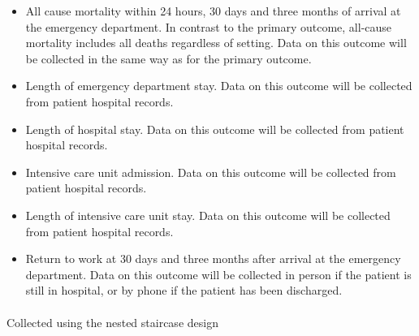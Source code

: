 \documentclass[
]{scrartcl}
\makeatletter
\let\oldparagraph\paragraph
\renewcommand{\paragraph}{
    \@ifstar
      \xxxParagraphStar
      \xxxParagraphNoStar
  }
\newcommand{\xxxParagraphStar}[1]{\oldparagraph*{#1}\mbox{}}
\newcommand{\xxxParagraphNoStar}[1]{\oldparagraph{#1}\mbox{}}
\providecommand{\tightlist}{%
  \setlength{\itemsep}{0pt}\setlength{\parskip}{0pt}}\usepackage{longtable,booktabs,array}
\makeatother
\begin{document}
\begin{itemize}
\tightlist
\item
  All cause mortality within 24 hours, 30 days and three months of
  arrival at the emergency department. In contrast to the primary
  outcome, all-cause mortality includes all deaths regardless of
  setting. Data on this outcome will be collected in the same way as for
  the primary outcome.
\item
  Length of emergency department stay. Data on this outcome will be
  collected from patient hospital records.
\item
  Length of hospital stay. Data on this outcome will be collected from
  patient hospital records.
\item
  Intensive care unit admission. Data on this outcome will be collected
  from patient hospital records.
\item
  Length of intensive care unit stay. Data on this outcome will be
  collected from patient hospital records.
\item
  Return to work at 30 days and three months after arrival at the
  emergency department. Data on this outcome will be collected in person
  if the patient is still in hospital, or by phone if the patient has
  been discharged.
\end{itemize}

\paragraph{Collected using the nested staircase
design}\label{collected-using-the-nested-staircase-design}
\end{document}
